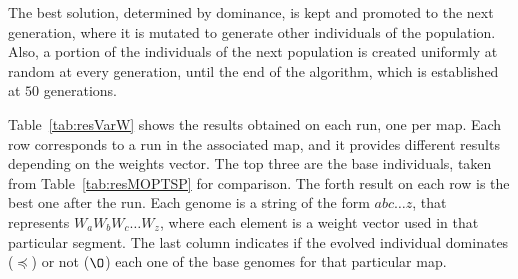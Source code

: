 \documentclass[journal]{IEEEtran}
\begin{document}
The best solution, determined by dominance, is kept and promoted to the next generation, where it is mutated to generate other individuals of the population. Also, a portion of the individuals of the next population is created uniformly at random at every generation, until the end of the algorithm, which is established at $50$ generations. 

Table~\ref{tab:resVarW} shows the results obtained on each run, one per map.  Each row corresponds to a run in the associated map, and it provides different results depending on the weights vector. The top three are the base individuals, taken from Table~\ref{tab:resMOPTSP} for comparison. The forth result on each row is the best one after the run. Each genome is a string of the form $abc \dots z$, that represents $W_aW_bW_c \dots W_z$, where each element is a weight vector used in that particular segment. The last column indicates if the evolved individual dominates ($\preceq$) or not ($\O$) each one of the base genomes for that particular map.
\end{document}
